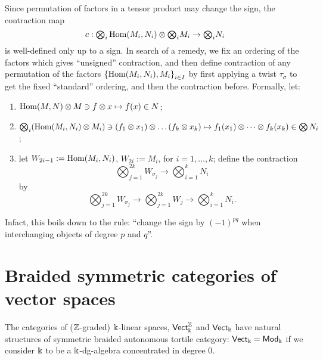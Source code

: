 Since permutation of factors in a tensor product may change the sign,
the contraction map 
\begin{equation*}
c: {\textstyle \bigotimes_i} \Hom(M_i, N_i) \otimes
 {\textstyle \bigotimes_i} M_i \to  {\textstyle \bigotimes_i} N_i
\end{equation*}
is well-defined only up to a sign. In search of a remedy, we fix an
ordering of the factors which gives ``unsigned'' contraction, and then
define contraction of any permutation of the factors
$\left\{\Hom(M_i,N_i), M_i\right\}_{i\in I}$ by first applying a
twist $\tau_\sigma$ to get the fixed ``standard'' ordering, and then the
contraction before. Formally, let:
\begin{enumerate}
\item $\Hom(M,N) \otimes M \ni f\otimes x \mapsto f(x) \in N$;
\item $\bigotimes_i (\Hom(M_i, N_i) \otimes M_i) \ni (f_1\otimes x_1)
  \otimes \dots (f_k\otimes x_k) \mapsto f_1(x_1) \otimes \dots
  \otimes f_k(x_k) \in \bigotimes N_i$;
\item let $W_{2i-1} := \Hom(M_i, N_i)$, $W_{2i} := M_i$, for $i =
  1, \dots, k$; define the contraction
  \begin{equation*}
    {\textstyle \bigotimes_{j=1}^{2k}} W_{\sigma_j} \to
    {\textstyle \bigotimes_{i=1}^k} N_i
  \end{equation*}
  by 
  \begin{equation*}
    {\textstyle \bigotimes_{j=1}^{2k}} W_{\sigma_j} \to {\textstyle \bigotimes_{j=1}^{2k}} W_j \to
    {\textstyle \bigotimes_{i=1}^{k}} N_i.
  \end{equation*}
\end{enumerate}

Infact, this boils down to the rule: ``change the sign by
$(-1)^{pq}$ when interchanging objects of degree $p$ and $q$''.


\section{Braided symmetric categories of vector spaces}
\label{sec:btc-vect}

The categories of ($\setZ$-graded) $\fk$-linear spaces, $\catVect[\fk]^\setZ$
and $\catVect[\fk]$ have natural structures of symmetric braided
autonomous tortile category: $\catVect[\fk] = \catMod_\fk$ if we
consider $\fk$ to be a $\fk$-dg-algebra concentrated in degree $0$.

